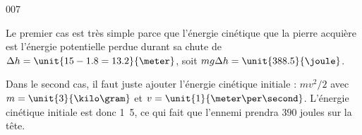 \begin{corrige}{007}

Le premier cas est très simple parce que l'énergie cinétique que la pierre acquière est l'énergie potentielle perdue durant sa chute de $\Delta h=\unit{15-1.8=13.2}{\meter}$, soit $mg\Delta h=\unit{388.5}{\joule}$.

Dans le second cas, il faut juste ajouter l'énergie cinétique initiale : $mv^2/2$ avec $m=\unit{3}{\kilo\gram}$ et $v=\unit{1}{\meter\per\second}$. L'énergie cinétique initiale est donc \unit{1.5}{\joule}, ce qui fait que l'ennemi prendra $390$ joules sur la tête.

\end{corrige}


